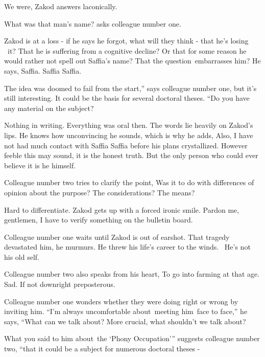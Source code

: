 \documentclass[letterpaper]{article}
\begin{document}
{\textquotedbl}We were,{\textquotedbl} Zakod answers laconically. 

{\textquotedbl}What was that man's name?{\textquotedbl} asks colleague number one.

Zakod is at a loss - if he says he forgot, what will they think - that he's losing
{\ }it?{ }That he is suffering from a cognitive decline? Or that for some reason he would
rather not spell out Saffia's name? That the question~embarrasses him? He says, {\textquotedbl}Saffia. Saffia
Saffia.{\textquotedbl} 

{\textquotedbl}The idea was doomed to fail from the start,'' says colleague number one, {\textquotedbl}but it's still
interesting. It could be the basis for several doctoral theses. ``Do you have any material on the
subject?{\textquotedbl} 

{\textquotedbl}Nothing in writing. Everything was oral then.{\textquotedbl} The words lie heavily on Zakod's lips. He
knows how unconvincing he sounds, which is why he adds, {\textquotedbl}Also, I have not had much contact with Saffia
Saffia before his plans crystallized.{\textquotedbl} However feeble this may sound, it is the honest truth. But the
only person who could ever believe it is he himself. 

Colleague number two tries to clarify the point, {\textquotedbl}Was it to do with differences of opinion about the
purpose? The considerations? The means?{\textquotedbl} 

{\textquotedbl}Hard to differentiate.{\textquotedbl} Zakod gets up with a forced ironic smile. {\textquotedbl}Pardon me,
gentlemen, I have to verify something on the bulletin board.{\textquotedbl}

Colleague number one waits until Zakod is out of earshot. {\textquotedbl}That tragedy devastated him,{\textquotedbl} he
murmurs. {\textquotedbl}He threw his life's career to the winds. \ He's not his old self.{\textquotedbl} 

Colleague number two also speaks from his heart, {\textquotedbl}To go into farming at that age. Sad. If not downright
preposterous.{\textquotedbl} 

Colleague number one wonders whether they were doing right or wrong by inviting him. ``I'm always uncomfortable
about~meeting him~face to face,'' he says, ``What can we talk about? More crucial, what shouldn't we talk
about?{\textquotedbl}

{\textquotedbl}What you said to him about~the `Phony Occupation'{}'' suggests colleague number two, ``that it could be a
subject for numerous doctoral theses -{\textquotedbl} 
\end{document}

